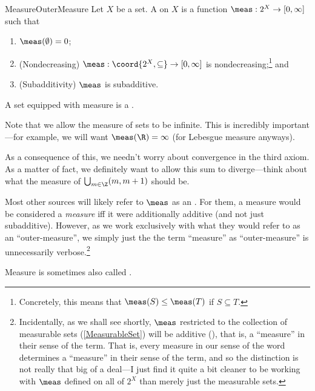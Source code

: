 \begin{dfn}{Measure}{OuterMeasure}
Let $X$ be a set.  A  on $X$ is a function $\meas :2^X\rightarrow [0,\infty ]$ such that
\begin{enumerate}
\item $\meas (\emptyset )=0$;
\item (Nondecreasing)\label{Measure.Monotonicity} $\meas :\coord{2^X,\subseteq}\rightarrow [0,\infty ]$ is nondecreasing;\footnote{Concretely, this means that $\meas (S)\leq \meas (T)$ if $S\subseteq T$.} and
\item (Subadditivity) $\meas$ is subadditive.
\end{enumerate}
A set equipped with measure is a .
\begin{rmk}
Note that we allow the measure of sets to be infinite.  This is incredibly important---for example, we will want $\meas (\R )=\infty$ (for Lebesgue measure anyways).
\end{rmk}
\begin{rmk}
As a consequence of this, we needn't worry about convergence in the third axiom.  As a matter of fact, we definitely want to allow this sum to diverge---think about what the measure of $\bigcup _{m\in \Z}(m,m+1)$ should be.
\end{rmk}
\begin{rmk}
Most other sources will likely refer to $\meas$ as an .  For them, a measure would be considered a \emph{measure} iff it were additionally additive (and not just subadditive).  However, as we work exclusively with what they would refer to as an ``outer-measure'', we simply just the the term ``measure'' as ``outer-measure'' is unnecessarily verbose.\footnote{Incidentally, as we shall see shortly, $\meas$ restricted to the collection of measurable sets (\cref{MeasurableSet}) will be additive (), that is, a ``measure'' in their sense of the term.  That is, every measure in our sense of the word determines a ``measure'' in their sense of the term, and so the distinction is not really that big of a deal---I just find it quite a bit cleaner to be working with $\meas$ defined on all of $2^X$ than merely just the measurable sets.}
\end{rmk}
\begin{rmk}
Measure is sometimes also called .
\end{rmk}
\end{dfn}

